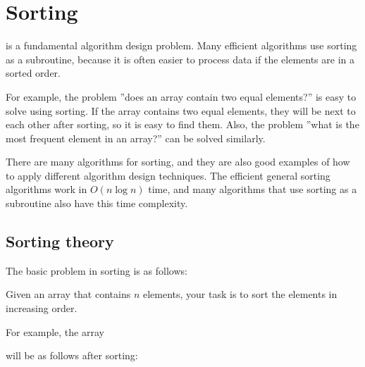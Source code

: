 \chapter{Sorting}


is a fundamental algorithm design problem.
Many efficient algorithms
use sorting as a subroutine,
because it is often easier to process
data if the elements are in a sorted order.

For example, the problem ''does an array contain
two equal elements?'' is easy to solve using sorting.
If the array contains two equal elements,
they will be next to each other after sorting,
so it is easy to find them.
Also, the problem ''what is the most frequent element
in an array?'' can be solved similarly.

There are many algorithms for sorting, and they are
also good examples of how to apply
different algorithm design techniques.
The efficient general sorting algorithms
work in $O(n \log n)$ time,
and many algorithms that use sorting
as a subroutine also
have this time complexity.

\section{Sorting theory}

The basic problem in sorting is as follows:
\begin{framed}
\noindent
Given an array that contains $n$ elements,
your task is to sort the elements
in increasing order.
\end{framed}
\noindent
For example, the array
\begin{center}
\end{center}
will be as follows after sorting:
\begin{center}
\end{center}

